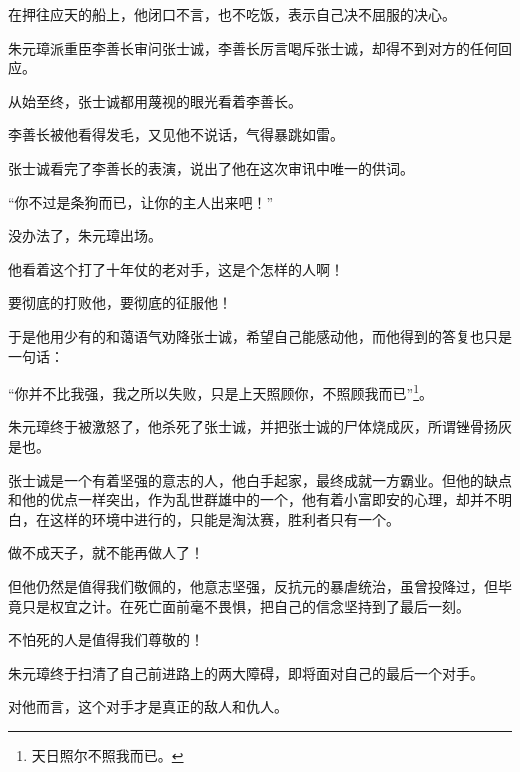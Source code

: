 \begin{multicols}{\theparacolNo}
		在押往应天的船上，他闭口不言，也不吃饭，表示自己决不屈服的决心。

		朱元璋派重臣李善长审问张士诚，李善长厉言喝斥张士诚，却得不到对方的任何回应。

		从始至终，张士诚都用蔑视的眼光看着李善长。

		李善长被他看得发毛，又见他不说话，气得暴跳如雷。

		张士诚看完了李善长的表演，说出了他在这次审讯中唯一的供词。

		“你不过是条狗而已，让你的主人出来吧！”

		没办法了，朱元璋出场。

		他看着这个打了十年仗的老对手，这是个怎样的人啊！

		要彻底的打败他，要彻底的征服他！

		于是他用少有的和蔼语气劝降张士诚，希望自己能感动他，而他得到的答复也只是一句话：

		“你并不比我强，我之所以失败，只是上天照顾你，不照顾我而已”\footnote{天日照尔不照我而已。}。

		朱元璋终于被激怒了，他杀死了张士诚，并把张士诚的尸体烧成灰，所谓锉骨扬灰是也。

		张士诚是一个有着坚强的意志的人，他白手起家，最终成就一方霸业。但他的缺点和他的优点一样突出，作为乱世群雄中的一个，他有着小富即安的心理，却并不明白，在这样的环境中进行的，只能是淘汰赛，胜利者只有一个。

		做不成天子，就不能再做人了！

		但他仍然是值得我们敬佩的，他意志坚强，反抗元的暴虐统治，虽曾投降过，但毕竟只是权宜之计。在死亡面前毫不畏惧，把自己的信念坚持到了最后一刻。

		不怕死的人是值得我们尊敬的！

		朱元璋终于扫清了自己前进路上的两大障碍，即将面对自己的最后一个对手。

		对他而言，这个对手才是真正的敌人和仇人。
		\ifnum{}
	\end{multicols}
\fi
\newpage
